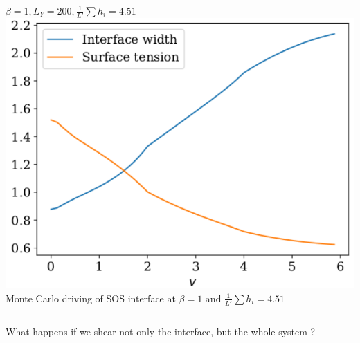 \documentclass[9pt, dvipsnames,aspectratio=169]{beamer} %
\begin{document}
\begin{frame}
\begin{columns}
			\centering
			$\beta = 1, L_Y = 200, \frac{1}{L'}\sum h_i = 4.51$
		\pause
		\centering
	    \includegraphics[width=\linewidth]{tension-drive.pdf} \\
	    {\small Monte Carlo driving of SOS interface at $\beta=1$ and $\frac{1}{L'}\sum h_i = 4.51$ }
		\end{columns}
\end{frame}

\begin{frame}
	\centering
	\huge What happens if we shear not only the interface, but the whole system ?
\end{frame}
\end{document}
